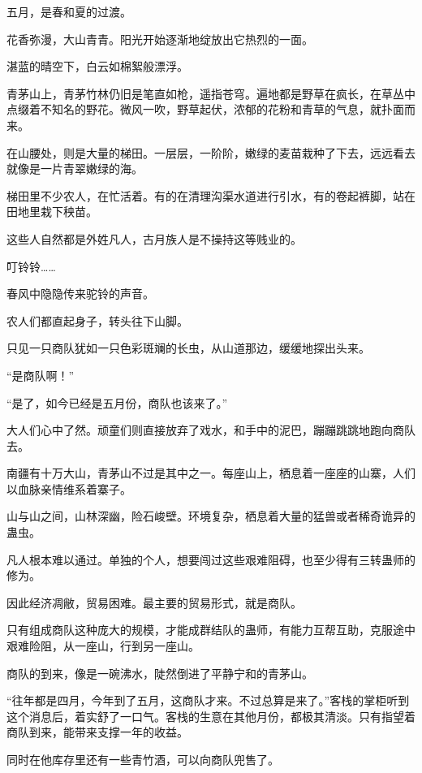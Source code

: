 
\begin{this_body}

五月，是春和夏的过渡。

花香弥漫，大山青青。阳光开始逐渐地绽放出它热烈的一面。

湛蓝的晴空下，白云如棉絮般漂浮。

青茅山上，青茅竹林仍旧是笔直如枪，遥指苍穹。遍地都是野草在疯长，在草丛中点缀着不知名的野花。微风一吹，野草起伏，浓郁的花粉和青草的气息，就扑面而来。

在山腰处，则是大量的梯田。一层层，一阶阶，嫩绿的麦苗栽种了下去，远远看去就像是一片青翠嫩绿的海。

梯田里不少农人，在忙活着。有的在清理沟渠水道进行引水，有的卷起裤脚，站在田地里栽下秧苗。

这些人自然都是外姓凡人，古月族人是不操持这等贱业的。

叮铃铃……

春风中隐隐传来驼铃的声音。

农人们都直起身子，转头往下山脚。

只见一只商队犹如一只色彩斑斓的长虫，从山道那边，缓缓地探出头来。

“是商队啊！”

“是了，如今已经是五月份，商队也该来了。”

大人们心中了然。顽童们则直接放弃了戏水，和手中的泥巴，蹦蹦跳跳地跑向商队去。

南疆有十万大山，青茅山不过是其中之一。每座山上，栖息着一座座的山寨，人们以血脉亲情维系着寨子。

山与山之间，山林深幽，险石峻壁。环境复杂，栖息着大量的猛兽或者稀奇诡异的蛊虫。

凡人根本难以通过。单独的个人，想要闯过这些艰难阻碍，也至少得有三转蛊师的修为。

因此经济凋敝，贸易困难。最主要的贸易形式，就是商队。

只有组成商队这种庞大的规模，才能成群结队的蛊师，有能力互帮互助，克服途中艰难险阻，从一座山，行到另一座山。

商队的到来，像是一碗沸水，陡然倒进了平静宁和的青茅山。

“往年都是四月，今年到了五月，这商队才来。不过总算是来了。”客栈的掌柜听到这个消息后，着实舒了一口气。客栈的生意在其他月份，都极其清淡。只有指望着商队到来，能带来支撑一年的收益。

同时在他库存里还有一些青竹酒，可以向商队兜售了。


\end{this_body}
